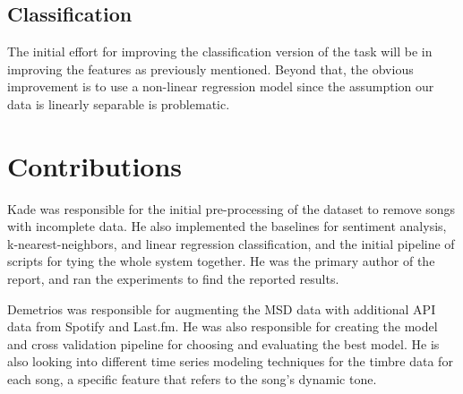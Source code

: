 \documentclass[10pt,journal,compsoc]{IEEEtran}
\begin{document}
\subsection{Classification}
The initial effort for improving the classification version of the task will be in improving the features as previously mentioned. Beyond that, the obvious improvement is to use a non-linear regression model since the assumption our data is linearly separable is problematic.

\section{Contributions}
Kade was responsible for the initial pre-processing of the dataset to remove songs with incomplete data. He also implemented the baselines for sentiment analysis, k-nearest-neighbors, and linear regression classification, and the initial pipeline of scripts for tying the whole system together. He was the primary author of the report, and ran the experiments to find the reported results.

Demetrios was responsible for augmenting the MSD data with additional API data from Spotify and Last.fm. He was also responsible for creating the model and cross validation pipeline for choosing and evaluating the best model. He is also looking into different time series modeling techniques for the timbre data for each song, a specific feature that refers to the song's dynamic tone.

{}


%

\end{document}
